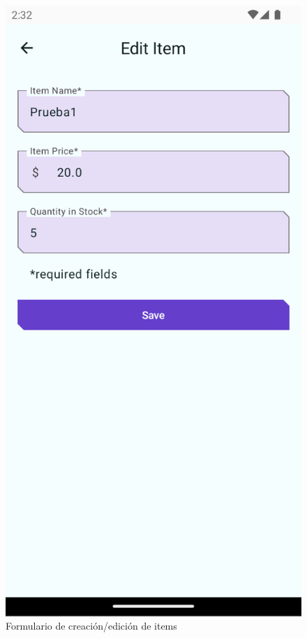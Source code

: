 \documentclass{article}
\begin{document}
        \begin{figure}[H]
            \centerline{\includegraphics[scale=0.3]{codelab2_2.png}}
            \caption{Formulario de creación/edición de items}
            \label{fig:codelab2_2}
        \end{figure}
\end{document}
